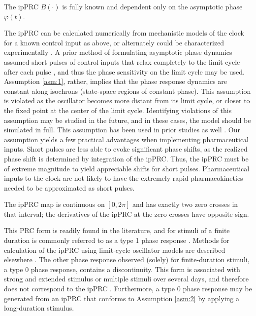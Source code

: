 \begin{asm}\label{asm:1}
    The ipPRC $B(\cdot)$ is fully known and dependent only on the asymptotic phase $\varphi(t)$.
\end{asm}
The ipPRC can be calculated numerically from mechanistic models of the clock for a known control input as above, or alternately could be characterized experimentally \cite{Taylor2008a,Johnson1999}.
A prior method of formulating asymptotic phase dynamics assumed short pulses of control inputs that relax completely to the limit cycle after each pulse \cite{Efimov2009}, and thus the phase sensitivity on the limit cycle may be used.
Assumption \ref{asm:1}, rather, implies that the phase response dynamics are constant along isochrons (state-space regions of constant phase).
This assumption is violated as the oscillator becomes more distant from its limit cycle, or closer to the fixed point at the center of the limit cycle.
Identifying violations of this assumption may be studied in the future, and in these cases, the model should be simulated in full.
This assumption has been used in prior studies as well \cite{Qiao2017, Julius2017}.
Our assumption yields a few practical advantages when implementing pharmaceutical inputs.
Short pulses are less able to evoke significant phase shifts, as the realized phase shift is determined by integration of the ipPRC.
Thus, the ipPRC must be of extreme magnitude to yield appreciable shifts for short pulses.
Pharmaceutical inputs to the clock are not likely to have the extremely rapid pharmacokinetics needed to be approximated as short pulses.

\begin{asm}
    The ipPRC map is continuous on $[0, 2\pi]$ and has exactly two zero crosses in that interval; the derivatives of the ipPRC at the zero crosses have opposite sign.\label{asm:2}
\end{asm}

This PRC form is readily found in the literature, and for stimuli of a finite duration is commonly referred to as a type 1 phase response \cite{Winfree2001, Johnson1999}.
Methods for calculation of the ipPRC using limit-cycle oscillator models are described elsewhere \cite{Taylor2008a}.
The other phase response observed (solely) for finite-duration stimuli, a type 0 phase response, contains a discontinuity.
This form is associated with strong and extended stimulus or multiple stimuli over several days, and therefore does not correspond to the ipPRC \cite{Winfree2001, Johnson1999, Kronauer1999}.
Furthermore, a type 0 phase response may be generated from an ipPRC that conforms to Assumption \ref{asm:2} by applying a long-duration stimulus.



